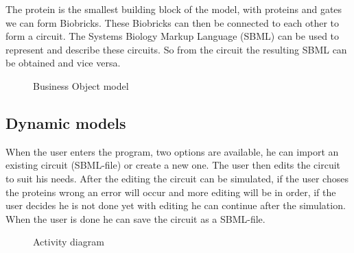 \documentclass[a4paper]{article}
\begin{document}
The protein is the smallest building block of the model, with proteins and gates we can form Biobricks. These Biobricks can then be connected to each other to form a circuit. The Systems Biology Markup Language (SBML) can be used to represent and describe these circuits. So from the circuit the resulting SBML can be obtained and vice versa.
\begin{figure}[h!]
	\caption{Business Object model}
	\centering
\end{figure}

\subsection{Dynamic models}
When the user enters the program, two options are available, he can import an existing circuit (SBML-file) or create a new one. The user then edits the circuit to suit his needs. After the editing the circuit can be simulated, if the user choses the proteins wrong an error will occur and more editing will be in order, if the user decides he is not done yet with editing he can continue after the simulation. When the user is done he can save the circuit as a SBML-file.
\begin{figure}[h!]
	\label{fig-gui}	
	\caption{Activity diagram}
	\centering
\end{figure}
\pagebreak



\pagebreak
\end{document}
